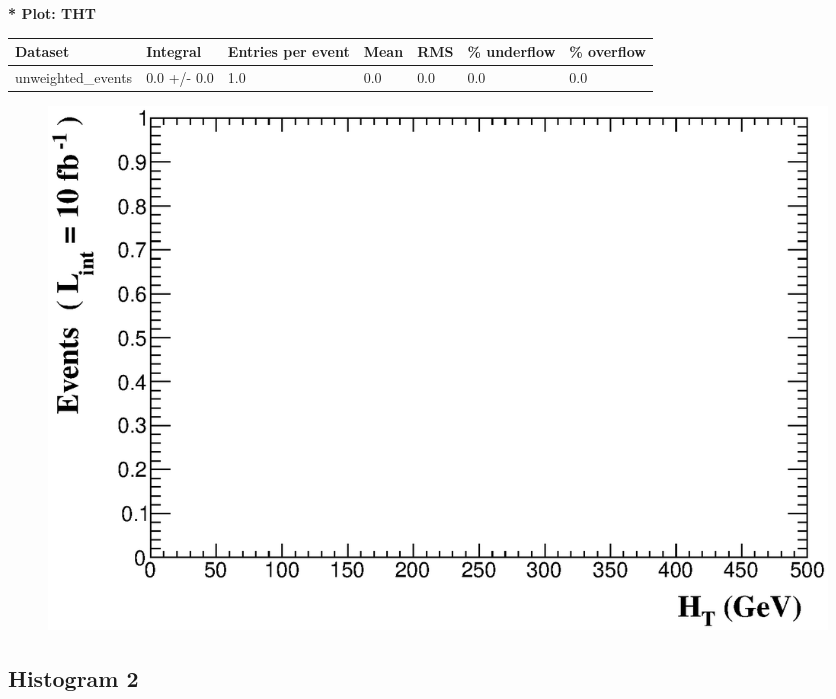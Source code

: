 \documentclass[a4paper, 10pt]{article}
\begin{document}
\textbf{* Plot: THT}\\
   \begin{table}[H]
  \begin{center}
    \begin{tabular}{|m{23.0mm}|m{23.0mm}|m{18.0mm}|m{19.0mm}|m{19.0mm}|m{19.0mm}|m{19.0mm}|}
      \hline
      {\cellcolor{yellow}         Dataset}& {\cellcolor{yellow}         Integral}& {\cellcolor{yellow}         Entries per event}& {\cellcolor{yellow}         Mean}& {\cellcolor{yellow}         RMS}& {\cellcolor{yellow}         \% underflow}& {\cellcolor{yellow}         \% overflow}\\
      \hline
      {\cellcolor{white}         unweighted\_events}& {\cellcolor{white}         0.0 +/\-- 0.0}& {\cellcolor{white}         1.0}& {\cellcolor{white}         0.0}& {\cellcolor{white}         0.0}& {\cellcolor{green}         0.0}& {\cellcolor{green}         0.0}\\
\hline
    \end{tabular}
  \end{center}
\end{table}

\begin{figure}[H]
  \begin{center}
    \includegraphics[scale=0.45]{selection_0.eps}\\
\caption{   }
  \end{center}
\end{figure}
      \newpage
\subsection{ Histogram 2}
\end{document}
